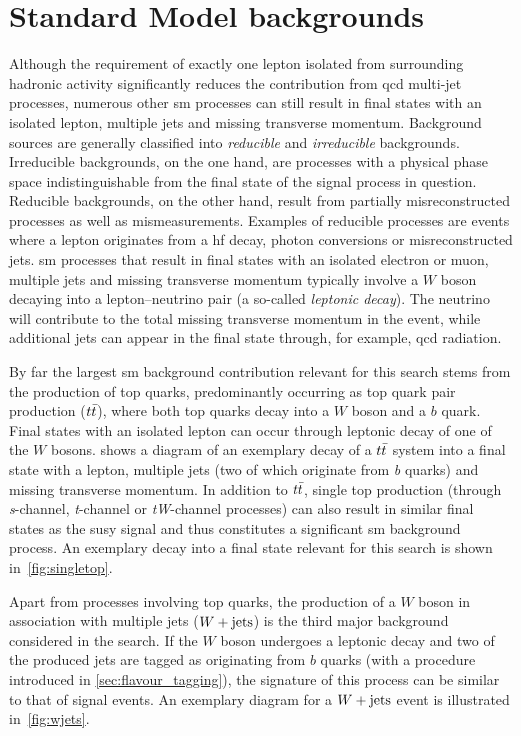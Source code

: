 \section{Standard Model backgrounds}

Although the requirement of exactly one lepton isolated from surrounding hadronic activity significantly reduces the contribution from \gls{qcd} multi-jet processes, numerous other \gls{sm} processes can still result in final states with an isolated lepton, multiple jets and missing transverse momentum.
Background sources are generally classified into \textit{reducible} and \textit{irreducible} backgrounds. Irreducible backgrounds, on the one hand, are processes with a physical phase space indistinguishable from the final state of the signal process in question. Reducible backgrounds, on the other hand, result from partially misreconstructed processes as well as mismeasurements.
Examples of reducible processes are events where a lepton originates from a \gls{hf} decay, photon conversions or misreconstructed jets. \gls{sm} processes that result in final states with an isolated electron or muon, multiple jets and missing transverse momentum typically involve a $W$ boson decaying into a lepton--neutrino pair (a so-called \textit{leptonic decay}).
The neutrino will contribute to the total missing transverse momentum in the event, while additional jets can appear in the final state through, for example, \gls{qcd} radiation.

By far the largest \gls{sm} background contribution relevant for this search stems from the production of top quarks, predominantly occurring as top quark pair production ($t\bar{t}$), where both top quarks decay into a $W$ boson and a $b$ quark. Final states with an isolated lepton can occur through leptonic decay of one of the $W$ bosons.
 shows a diagram of an exemplary decay of a $t\bar{t}$ system into a final state with a lepton, multiple jets (two of which originate from \textit{b} quarks) and missing transverse momentum.
In addition to $t\bar{t}$, single top production (through \textit{s}-channel, \textit{t}-channel or \textit{tW}-channel processes) can also result in similar final states as the \gls{susy} signal and thus constitutes a significant \gls{sm} background process.
An exemplary decay into a final state relevant for this search is shown in~\cref{fig:singletop}.

Apart from processes involving top quarks, the production of a $W$ boson in association with multiple jets ($W+\mathrm{jets}$) is the third major background considered in the \onelepton search.
If the $W$ boson undergoes a leptonic decay and two of the produced jets are tagged as originating from $b$ quarks (with a procedure introduced in \cref{sec:flavour_tagging}), the signature of this process can be similar to that of signal events.
An exemplary diagram for a $W+\mathrm{jets}$ event is illustrated in~\cref{fig:wjets}.

